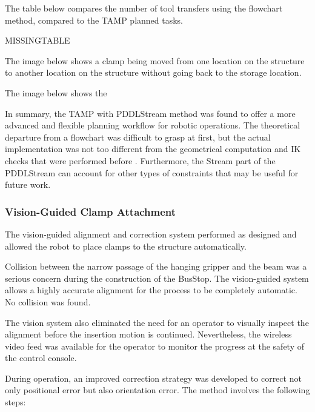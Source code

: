 The table below compares the number of tool transfers using the flowchart method, compared to the TAMP planned tasks.


MISSINGTABLE

The image below shows a clamp being moved from one location on the structure to another location on the structure without going back to the storage location.




The image below shows the 




In summary, the TAMP with PDDLStream method was found to offer a more advanced and flexible planning workflow for robotic operations. The theoretical departure from a flowchart was difficult to grasp at first, but the actual implementation was not too different from the geometrical computation and IK checks that were performed before . Furthermore, the Stream part of the PDDLStream can account for other types of constraints that may be useful for future work. 

\subsubsection{Vision-Guided Clamp Attachment}
\label{subsubsection:exploration-5-vision-guided-clamp-attachment}

The vision-guided alignment and correction system performed as designed and allowed the robot to place clamps to the structure automatically. 

Collision between the narrow passage of the hanging gripper and the beam was a serious concern during the construction of the BusStop. The vision-guided system allows a highly accurate alignment for the process to be completely automatic. No collision was found.

The vision system also eliminated the need for an operator to visually inspect the alignment before the insertion motion is continued. Nevertheless, the wireless video feed was available for the operator to monitor the progress at the safety of the control console.

During operation, an improved correction strategy was developed to correct not only positional error but also orientation error. The method involves the following steps:

